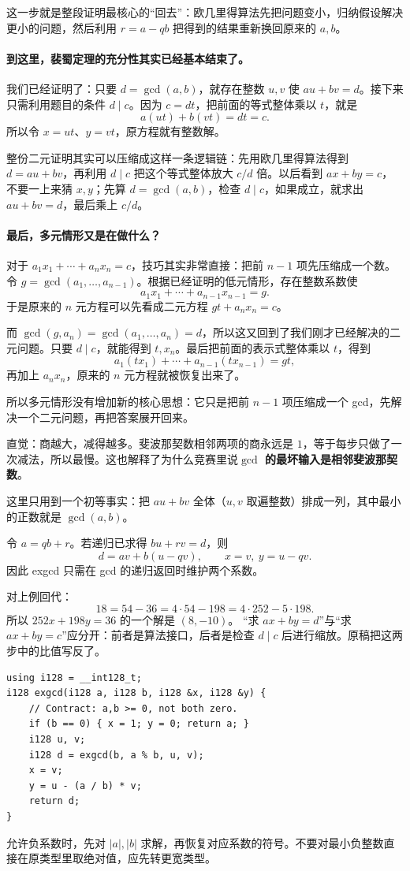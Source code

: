 \begin{pitfall}[思考：这份证明为什么要这样走？]
这一步就是整段证明最核心的“回去”：欧几里得算法先把问题变小，归纳假设解决更小的问题，然后利用 $r=a-qb$ 把得到的结果重新换回原来的 $a,b$。

\paragraph{到这里，裴蜀定理的充分性其实已经基本结束了。}
我们已经证明了：只要 $d=\gcd(a,b)$，就存在整数 $u,v$ 使 $au+bv=d$。接下来只需利用题目的条件 $d\mid c$。因为 $c=dt$，把前面的等式整体乘以 $t$，就是
\[
 a(ut)+b(vt)=dt=c.
\]
所以令 $x=ut$、$y=vt$，原方程就有整数解。

整份二元证明其实可以压缩成这样一条逻辑链：先用欧几里得算法得到 $d=au+bv$，再利用 $d\mid c$ 把这个等式整体放大 $c/d$ 倍。以后看到 $ax+by=c$，不要一上来猜 $x,y$；先算 $d=\gcd(a,b)$，检查 $d\mid c$，如果成立，就求出 $au+bv=d$，最后乘上 $c/d$。

\paragraph{最后，多元情形又是在做什么？}
对于 $a_1x_1+\cdots+a_nx_n=c$，技巧其实非常直接：把前 $n-1$ 项先压缩成一个数。令 $g=\gcd(a_1,\ldots,a_{n-1})$。根据已经证明的低元情形，存在整数系数使
\[
 a_1x_1+\cdots+a_{n-1}x_{n-1}=g.
\]
于是原来的 $n$ 元方程可以先看成二元方程 $gt+a_nx_n=c$。

而 $\gcd(g,a_n)=\gcd(a_1,\ldots,a_n)=d$，所以这又回到了我们刚才已经解决的二元问题。只要 $d\mid c$，就能得到 $t,x_n$。最后把前面的表示式整体乘以 $t$，得到
\[
 a_1(tx_1)+\cdots+a_{n-1}(tx_{n-1})=gt,
\]
再加上 $a_nx_n$，原来的 $n$ 元方程就被恢复出来了。

所以多元情形没有增加新的核心思想：它只是把前 $n-1$ 项压缩成一个 gcd，先解决一个二元问题，再把答案展开回来。
\end{pitfall}

\begin{tip}
直觉：商越大，减得越多。斐波那契数相邻两项的商永远是 $1$，等于每步只做了一次减法，所以最慢。这也解释了为什么竞赛里说\textbf{$\gcd$ 的最坏输入是相邻斐波那契数}。
\end{tip}

这里只用到一个初等事实：把 $au+bv$ 全体（$u,v$ 取遍整数）排成一列，其中最小的正数就是 $\gcd(a,b)$。

令 $a=qb+r$。若递归已求得 $bu+rv=d$，则
\[
 d=av+b(u-qv),\qquad x=v,\ y=u-qv.
\]
因此 exgcd 只需在 gcd 的递归返回时维护两个系数。


对上例回代：
\[
18=54-36=4\cdot54-198=4\cdot252-5\cdot198.
\]
所以 $252x+198y=36$ 的一个解是 $(8,-10)$。
“求 $ax+by=d$”与“求 $ax+by=c$”应分开：前者是算法接口，后者是检查 $d\mid c$ 后进行缩放。原稿把这两步中的比值写反了。
\begin{lstlisting}
using i128 = __int128_t;
i128 exgcd(i128 a, i128 b, i128 &x, i128 &y) {
    // Contract: a,b >= 0, not both zero.
    if (b == 0) { x = 1; y = 0; return a; }
    i128 u, v;
    i128 d = exgcd(b, a % b, u, v);
    x = v;
    y = u - (a / b) * v;
    return d;
}
\end{lstlisting}
允许负系数时，先对 $|a|,|b|$ 求解，再恢复对应系数的符号。不要对最小负整数直接在原类型里取绝对值，应先转更宽类型。


